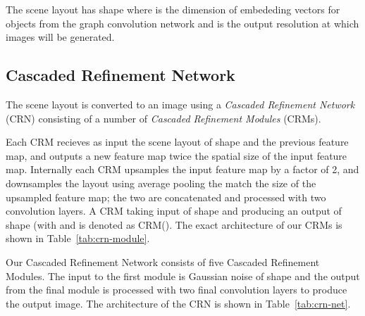 \documentclass[10pt,twocolumn,letterpaper]{article}
\begin{document}
The scene layout has shape  where  is the dimension of embededing vectors
for objects from the graph convolution network and  is the output resolution at
which images will be generated.

\subsection{Cascaded Refinement Network}
The scene layout is converted to an image using a \emph{Cascaded Refinement Network} (CRN) consisting of a
number of \emph{Cascaded Refinement Modules} (CRMs).

Each CRM recieves as input the scene layout of shape  and the
previous feature map, and outputs a new feature map twice the spatial size of the input feature map.
Internally each CRM upsamples the input feature map by a factor of 2, and downsamples the layout using
average pooling the match the size of the upsampled feature map; the two are concatenated and processed
with two convolution layers. A CRM taking input of shape  and producing
an output of shape  (with  and 
is denoted as CRM(). The exact architecture of our CRMs is
shown in Table~\ref{tab:crn-module}.

Our Cascaded Refinement Network consists of five Cascaded Refinement Modules. The input to the first
module is Gaussian noise of shape  and the output from the final module is processed
with two final convolution layers to produce the output image. The architecture of the CRN is shown
in Table~\ref{tab:crn-net}.

\begin{table}
  \centering
  \setlength{\tabcolsep}{1mm}
  \vspace{1mm}
  \caption{
    Architecture of a Cascaded Refinement Module
    CRM(. The module accepts as input
    the scene layout, and an input feature map of shape
     and produces as output a feature map of
    shape  where  and
    . For LeakyReLU nonlinearites we use negative slope 0.2.
  }
  \label{tab:crn-module}
\end{table}
\end{document}
